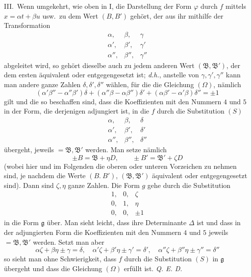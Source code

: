 III.\ Wenn umgekehrt, wie oben in I, die Darstellung der Form $\varphi$
durch $f$ mittels $x=\alpha t+\beta u$ usw.\ zu dem Wert $(B,B')$ gehört, der
aus ihr mithilfe der Transformation
\[
\begin{array}{ccc}
\alpha,&\beta,&\gamma\\
\alpha',&\beta',&\gamma'\\
\alpha'',&\beta'',&\gamma''
\end{array}
\]
abgeleitet wird, so gehört dieselbe auch zu jedem anderen Wert $(\mathfrak{B},\mathfrak{B}')$,
der dem ersten äquivalent oder entgegengesetzt ist;
\textit{d.h.}, anstelle von $\gamma,\gamma',\gamma''$ kann man andere ganze Zahlen
$\delta,\delta',\delta''$ wählen, für die die Gleichung $(\Omega)$, nämlich
\[
(\alpha'\beta''-\alpha''\beta')\delta+
(\alpha''\beta-\alpha\beta'')\delta'+
(\alpha\beta'-\alpha'\beta)\delta''=\pm1
\]
gilt und die so beschaffen sind, dass die Koeffizienten mit den Nummern
$4$ und $5$ in der Form, die derjenigen adjungiert ist, in die
$f$ durch die Substitution $(S)$
\[
\begin{array}{ccc}
\alpha,&\beta,&\delta\\
\alpha',&\beta',&\delta'\\
\alpha'',&\beta'',&\delta''
\end{array}
\]
übergeht, jeweils $=\mathfrak{B},\mathfrak{B}'$ werden. Man setze nämlich
\[
\pm B=\mathfrak{B}+\eta D,\qquad \pm B'=\mathfrak{B}'+\zeta D
\]
(wobei hier und im Folgenden die oberen oder unteren Vorzeichen zu nehmen
sind, je nachdem die Werte $(B.\ B')$, $(\mathfrak{B},\mathfrak{B}')$ äquivalent oder entgegengesetzt
sind). Dann sind $\zeta,\eta$ ganze Zahlen. Die Form $g$ gehe durch
die Substitution
\[
\begin{array}{ccc}
1,&0,&\zeta\\
0,&1,&\eta\\
0,&0,&\pm1
\end{array}
\]
in die Form $\mathfrak{g}$ über. Man sieht leicht, dass ihre Determinante
$\Delta$ ist und dass in der adjungierten Form die Koeffizienten mit den
Nummern $4$ und $5$ jeweils $=\mathfrak{B},\mathfrak{B}'$ werden. Setzt man aber
\[
\alpha\zeta+\beta\eta\pm\gamma=\delta,\quad
\alpha'\zeta+\beta'\eta\pm\gamma'=\delta',\quad
\alpha''\zeta+\beta''\eta\pm\gamma''=\delta''
\]
so sieht man ohne Schwierigkeit, dass $f$ durch die Substitution
$(S)$ in $\mathfrak{g}$ übergeht und dass die Gleichung $(\Omega)$ erfüllt
ist. \textit{Q. E. D.}

